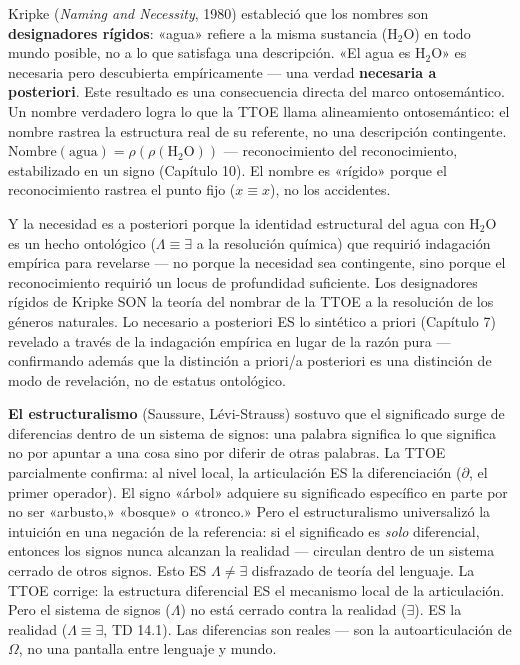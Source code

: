\documentclass[10pt, openany, oneside]{book}
\begin{document}
Kripke (\textit{Naming and Necessity}, 1980) estableció que los nombres son \textbf{designadores rígidos}: «agua» refiere a la misma sustancia (H$_2$O) en todo mundo posible, no a lo que satisfaga una descripción. «El agua es H$_2$O» es necesaria pero descubierta empíricamente --- una verdad \textbf{necesaria a posteriori}. Este resultado es una consecuencia directa del marco ontosemántico. Un nombre verdadero logra lo que la TTOE llama alineamiento ontosemántico: el nombre rastrea la estructura real de su referente, no una descripción contingente. $\text{Nombre}(\text{agua}) = \rho(\rho(\text{H}_2\text{O}))$ --- reconocimiento del reconocimiento, estabilizado en un signo (Capítulo 10). El nombre es «rígido» porque el reconocimiento rastrea el punto fijo ($x \equiv x$), no los accidentes.

Y la necesidad es a posteriori porque la identidad estructural del agua con H$_2$O es un hecho ontológico ($\Lambda \equiv \exists$ a la resolución química) que requirió indagación empírica para revelarse --- no porque la necesidad sea contingente, sino porque el reconocimiento requirió un locus de profundidad suficiente. Los designadores rígidos de Kripke SON la teoría del nombrar de la TTOE a la resolución de los géneros naturales. Lo necesario a posteriori ES lo sintético a priori (Capítulo 7) revelado a través de la indagación empírica en lugar de la razón pura --- confirmando además que la distinción a priori/a posteriori es una distinción de modo de revelación, no de estatus ontológico.

\textbf{El estructuralismo} (Saussure, L\'{e}vi-Strauss) sostuvo que el significado surge de diferencias dentro de un sistema de signos: una palabra significa lo que significa no por apuntar a una cosa sino por diferir de otras palabras. La TTOE parcialmente confirma: al nivel local, la articulación ES la diferenciación ($\partial$, el primer operador). El signo «árbol» adquiere su significado específico en parte por no ser «arbusto,» «bosque» o «tronco.» Pero el estructuralismo universalizó la intuición en una negación de la referencia: si el significado es \textit{solo} diferencial, entonces los signos nunca alcanzan la realidad --- circulan dentro de un sistema cerrado de otros signos. Esto ES $\Lambda \neq \exists$ disfrazado de teoría del lenguaje. La TTOE corrige: la estructura diferencial ES el mecanismo local de la articulación. Pero el sistema de signos ($\Lambda$) no está cerrado contra la realidad ($\exists$). ES la realidad ($\Lambda \equiv \exists$, TD 14.1). Las diferencias son reales --- son la autoarticulación de $\Omega$, no una pantalla entre lenguaje y mundo.
\end{document}
